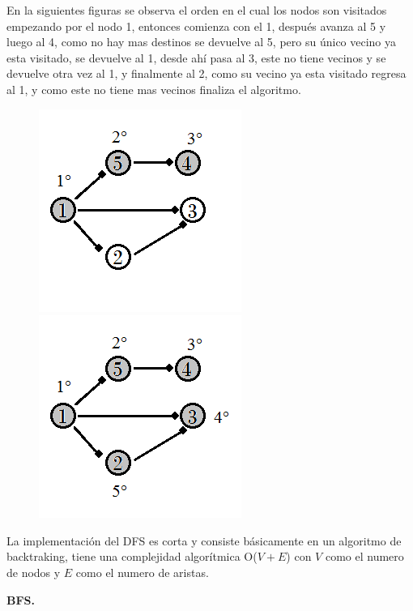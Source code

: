 \documentclass[12pt, a4paper]{article}
\newcommand\cppfile[2][]{

}
\newcommand{\subtitulo}[1]{\begin{center}\textbf{#1}\end{center}}
\begin{document}
	En la siguientes figuras se observa el orden en el cual los nodos son visitados empezando por el nodo 1, 
	entonces comienza con el 1, después avanza al 5 y luego al 4, como no hay mas destinos se devuelve al 5,
	pero su único vecino ya esta visitado, se devuelve al 1, desde ahí pasa al 3, este no tiene vecinos y se
	devuelve otra vez al 1, y finalmente al 2, como su vecino ya esta visitado regresa al 1, y como este no tiene
	mas vecinos finaliza el algoritmo.
	
	\begin{figure}[!htb]
			\centering
			\includegraphics[scale=1]{Grafos/imagenes/DFS_y_BFS/DFS1}
			\caption{}
			\label{grafos:DFS_y_BFS:DFS1}
		\endminipage
			\centering
			\includegraphics[scale=1]{Grafos/imagenes/DFS_y_BFS/DFS2}
			\caption{}
			\label{grafos:DFS_y_BFS:DFS2}
		\endminipage
	\end{figure}	
	
	La implementación del DFS es corta y consiste básicamente en un algoritmo de backtraking, tiene una complejidad
	algorítmica O($V+E$) con $V$ como el numero de nodos y $E$ como el numero de aristas.
	\cppfile[6-16]{Grafos/codigos/DFS.cpp}
	
	\subtitulo{BFS.}
	
\end{document}

